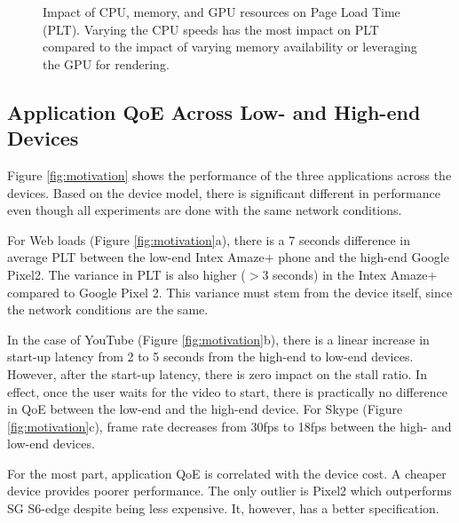 \begin{figure*}[t]
     \vspace{-0.1in}
     \caption{Impact of CPU, memory, and GPU resources on Page Load Time (PLT). Varying the CPU speeds has the most impact on PLT compared to the impact of varying memory availability or leveraging the GPU for rendering. }
     \vspace{-0.2in}
     \label{fig:isolation}
\end{figure*}

\subsection{Application QoE Across Low- and High-end Devices}

Figure \ref{fig:motivation} shows the performance of the three applications across the devices. Based on the device model, there is significant different in performance even though all experiments
are done with the same network conditions. 

For Web loads (Figure \ref{fig:motivation}a), there is a 7 seconds difference in average PLT between the low-end Intex Amaze+ phone and the high-end Google Pixel2. The variance in PLT is also higher ($>$3 seconds) in the Intex Amaze+ compared to Google Pixel 2. This variance must stem from the device itself, since the network conditions are the same.

In the case of YouTube (Figure \ref{fig:motivation}b), there is a linear increase 
in start-up latency from 2 to 5 seconds from the high-end to low-end devices. However, after the start-up latency, there is zero impact on the stall ratio. In effect, once the user waits for the video to start, there is practically no difference in QoE between the low-end and the high-end device. For Skype (Figure \ref{fig:motivation}c), frame rate decreases from 30fps to 18fps between the high- and low-end devices.

For the most part, application QoE is correlated with the device cost.  A
cheaper device provides poorer performance. The only outlier is Pixel2 
which outperforms SG S6-edge despite being less expensive. It, however,
has a better specification. 

